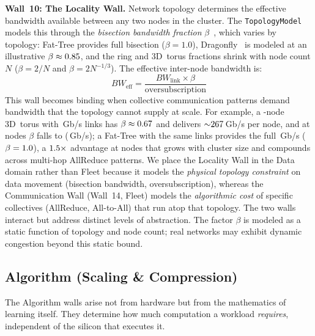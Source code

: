 \documentclass[10pt,twocolumn]{article}
\begin{document}
\textbf{Wall~10: The Locality Wall.} Network topology determines the effective bandwidth available between any two nodes in the cluster. The \texttt{TopologyModel} models this through the \emph{bisection bandwidth fraction} $\beta$~\citep{leiserson1985}, which varies by topology: Fat-Tree provides full bisection ($\beta = 1.0$), Dragonfly~\citep{kim2008dragonfly} is modeled at an illustrative $\beta \approx 0.85$, and the ring and 3D~torus fractions shrink with node count $N$ ($\beta = 2/N$ and $\beta = 2N^{-1/3}$). The effective inter-node bandwidth is:
\begin{equation}
\label{eq:locality}
BW_{\text{eff}} = \frac{BW_{\text{link}} \times \beta}{\text{oversubscription}}
\end{equation}
This wall becomes binding when collective communication patterns demand bandwidth that the topology cannot supply at scale. For example, a \WallTenTorusNodesSmall-node 3D~torus with \WallTenLinkGbps\,Gb/s links has $\beta \approx 0.67$ and delivers ${\sim}267$\,Gb/s per node, and at \WallTenTorusNodesLarge{} nodes $\beta$ falls to \WallTenTorusBetaLarge{} (\WallTenTorusEffGbpsLarge\,Gb/s); a Fat-Tree with the same links provides the full \WallTenLinkGbps\,Gb/s ($\beta = 1.0$), a $1.5{\times}$ advantage at \WallTenTorusNodesSmall{} nodes that grows with cluster size and compounds across multi-hop AllReduce patterns. We place the Locality Wall in the Data domain rather than Fleet because it models the \emph{physical topology constraint} on data movement (bisection bandwidth, oversubscription), whereas the Communication Wall (Wall~14, Fleet) models the \emph{algorithmic cost} of specific collectives (AllReduce, All-to-All) that run atop that topology. The two walls interact but address distinct levels of abstraction. The factor $\beta$ is modeled as a static function of topology and node count; real networks may exhibit dynamic congestion beyond this static bound.

\subsection{Algorithm (Scaling \& Compression)}
\label{sec:walls-algorithm}

The Algorithm walls arise not from hardware but from the mathematics of learning itself. They determine how much computation a workload \emph{requires}, independent of the silicon that executes it.
\end{document}
